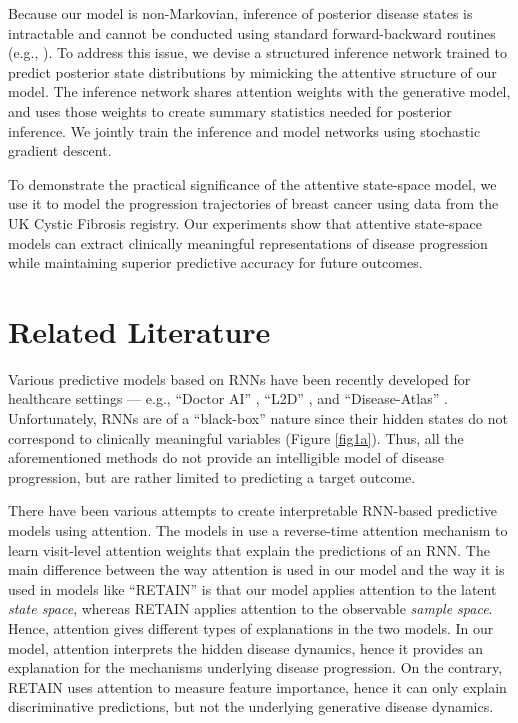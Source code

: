 \documentclass [PhD] {uclathes}
\begin{document}
Because our model is non-Markovian, inference of posterior disease states is intractable and cannot be conducted using standard forward-backward routines (e.g., \cite{liu2015efficient,dai2016recurrent,zheng2017state}). To address this issue, we devise a structured inference network trained to predict posterior state distributions by mimicking the attentive structure of our model. The inference network shares attention weights with the generative model, and uses those weights to create summary statistics needed for posterior inference. We jointly train the inference and model networks using stochastic gradient descent.

To demonstrate the practical significance of the attentive state-space model, we use it to model the progression trajectories of breast cancer using data from the UK Cystic Fibrosis registry. Our experiments show that attentive state-space models can extract clinically meaningful representations of disease progression while maintaining superior predictive accuracy for future outcomes. 

\section{Related Literature}

Various predictive models based on RNNs have been recently developed for healthcare settings --- e.g., ``Doctor AI'' \cite{choi2016doctor}, ``L2D'' \cite{lipton2015learning}, and ``Disease-Atlas'' \cite{lim2018disease}. Unfortunately, RNNs are of a ``black-box'' nature since their hidden states do not correspond to clinically meaningful variables (Figure \ref{fig1a}). Thus, all the aforementioned methods do not provide an intelligible model of disease progression, but are rather limited to predicting a target outcome.  

There have been various attempts to create interpretable RNN-based predictive models using attention. The models in \cite{choi2016retain,ma2017dipole,kwon2019retainvis} use a reverse-time attention mechanism to learn visit-level attention weights that explain the predictions of an RNN. The main difference between the way attention is used in our model and the way it is used in models like ``RETAIN'' \cite{choi2016retain} is that our model applies attention to the latent {\it state space}, whereas RETAIN applies attention to the observable {\it sample space}. Hence, attention gives different types of explanations in the two models. In our model, attention interprets the hidden disease dynamics, hence it provides an explanation for the mechanisms underlying disease progression. On the contrary, RETAIN uses attention to measure feature importance, hence it can only explain discriminative predictions, but not the underlying generative disease dynamics.  
\end{document}
